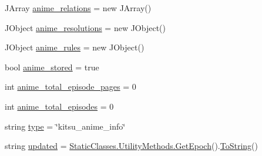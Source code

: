 \begin{DoxyCompactItemize}
\item 
J\+Array \mbox{\hyperlink{class_little_weeb_library_1_1_models_1_1_json_kitsu_anime_info_a8df2cf3af93654bd0362985dfd3208e0}{anime\+\_\+relations}} = new J\+Array()
\item 
J\+Object \mbox{\hyperlink{class_little_weeb_library_1_1_models_1_1_json_kitsu_anime_info_a10f0da892462fa2f1817e08336aea4ff}{anime\+\_\+resolutions}} = new J\+Object()
\item 
J\+Object \mbox{\hyperlink{class_little_weeb_library_1_1_models_1_1_json_kitsu_anime_info_ad0c35e5073c60e273c694a365e5e3ffa}{anime\+\_\+rules}} = new J\+Object()
\item 
bool \mbox{\hyperlink{class_little_weeb_library_1_1_models_1_1_json_kitsu_anime_info_a11190c3959e72a4b3b9fdd482de156cb}{anime\+\_\+stored}} = true
\item 
int \mbox{\hyperlink{class_little_weeb_library_1_1_models_1_1_json_kitsu_anime_info_a359be736ccb4ae5ccf50f5d754cd4973}{anime\+\_\+total\+\_\+episode\+\_\+pages}} = 0
\item 
int \mbox{\hyperlink{class_little_weeb_library_1_1_models_1_1_json_kitsu_anime_info_a05eac71810dc6aa9ae33a224b5a6957c}{anime\+\_\+total\+\_\+episodes}} = 0
\item 
string \mbox{\hyperlink{class_little_weeb_library_1_1_models_1_1_json_kitsu_anime_info_aad0a453cab7c5ec1c6ff16a23c90e35b}{type}} = \char`\"{}kitsu\+\_\+anime\+\_\+info\char`\"{}
\item 
string \mbox{\hyperlink{class_little_weeb_library_1_1_models_1_1_json_kitsu_anime_info_afc1bfd4e16df7491b9e7ae7380641938}{updated}} = \mbox{\hyperlink{class_little_weeb_library_1_1_static_classes_1_1_utility_methods_a12336d9e64983ddabaad8950486fafb2}{Static\+Classes.\+Utility\+Methods.\+Get\+Epoch}}().\mbox{\hyperlink{class_little_weeb_library_1_1_models_1_1_json_kitsu_anime_info_a869f64c42523b48911549a2f3fffffa7}{To\+String}}()
\end{DoxyCompactItemize}


